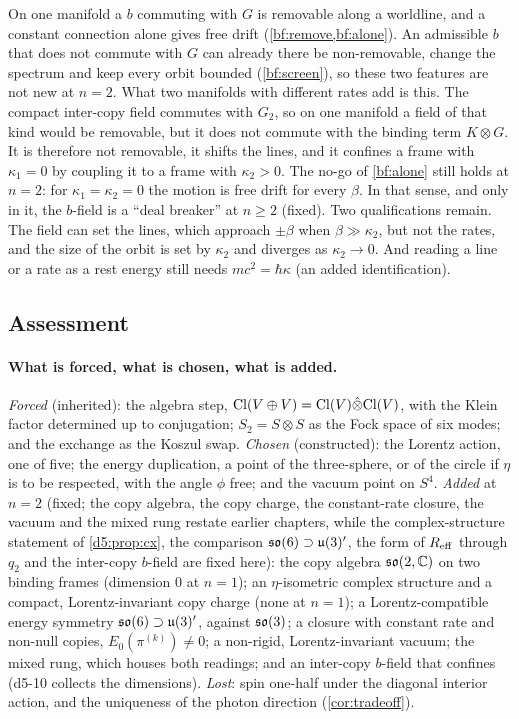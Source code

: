 \begin{remark}
\label{d5:rem:dealbreaker}
On one manifold a $b$ commuting with $G$ is removable along a worldline, and a constant connection alone gives free drift
(\cref{bf:remove,bf:alone}). An admissible $b$ that does not commute with $G$ can already there be non-removable, change the spectrum
and keep every orbit bounded (\cref{bf:screen}), so these two features are not new at $n=2$. What two manifolds with different rates add is
this. The compact inter-copy field commutes with $G_2$, so on one manifold a field of that kind would be removable, but it does not commute with
the binding term $K\otimes G$. It is therefore not removable, it shifts the lines, and it confines a frame with $\kappa_1=0$ by coupling it to a
frame with $\kappa_2>0$. The no-go of \cref{bf:alone} still holds at $n=2$: for $\kappa_1=\kappa_2=0$ the motion is free drift for every
$\beta$. In that sense, and only in it, the $b$-field is a ``deal breaker'' at $n\ge2$ (fixed). Two qualifications remain. The field can set the lines, which approach $\pm\beta$ when $\beta\gg\kappa_2$, but not the rates, and the size of
the orbit is set by $\kappa_2$ and diverges as $\kappa_2\to0$. And reading a line or a rate as a rest energy still needs $mc^2=\hbar\kappa$ (an added
identification).
\end{remark}

\subsection{Assessment}
\label{d5:sec:assess}

\paragraph{What is forced, what is chosen, what is added.} \emph{Forced} (inherited): the algebra step, $\mathrm{Cl}(V\oplus V)=\mathrm{Cl}(V)\hat\otimes\mathrm{Cl}(V)$, with the
Klein factor determined up to conjugation; $S_2=S\otimes S$ as the Fock space of six modes; and the exchange as the Koszul swap.
\emph{Chosen} (constructed): the Lorentz action, one of five; the energy duplication, a point of the three-sphere, or of the circle if $\eta$ is
to be respected, with the angle $\phi$ free; and the vacuum point on $S^4$. \emph{Added} at $n=2$ (fixed; the copy algebra, the copy charge, the constant-rate closure, the vacuum and the mixed rung restate earlier chapters, while the complex-structure statement of \cref{d5:prop:cx}, the comparison $\mathfrak{so}(6)\supset\mathfrak{u}(3)'$, the form of $R_{\rm eff}$ through $q_2$ and the inter-copy $b$-field are fixed here): the copy algebra $\mathfrak{so}(2,\mathbb{C})$ on two
binding frames (dimension $0$ at $n=1$); an $\eta$-isometric complex structure and a compact, Lorentz-invariant copy charge (none at $n=1$); a
Lorentz-compatible energy symmetry $\mathfrak{so}(6)\supset\mathfrak{u}(3)'$, against $\mathfrak{so}(3)$; a closure with constant rate and non-null copies, $E_0(\pi^{(k)})\neq0$; a non-rigid,
Lorentz-invariant vacuum; the mixed rung, which houses both readings; and an inter-copy $b$-field that confines (d5-10 collects the
dimensions). \emph{Lost}: spin one-half under the diagonal interior action, and the uniqueness of the photon direction (\cref{cor:tradeoff}).

